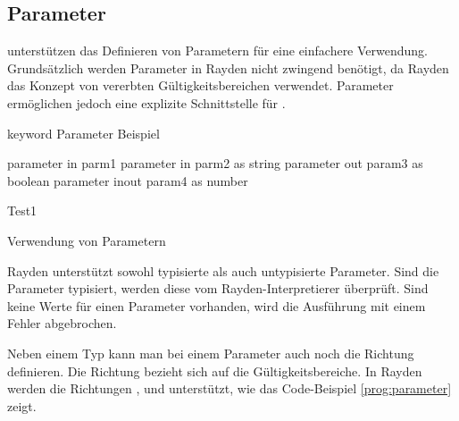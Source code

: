 
\subsection{Parameter}
\label{cha:Parameter}

 unterstützen das Definieren von Parametern für eine einfachere Verwendung. Grundsätzlich werden Parameter in Rayden nicht zwingend benötigt, da Rayden das Konzept von vererbten Gültigkeitsbereichen verwendet. Parameter ermöglichen jedoch eine explizite Schnittstelle für . 

\begin{program}
\begin{JavaCode}
keyword Parameter Beispiel {
	
	parameter in    parm1
	parameter in    parm2 as string
	parameter out   param3 as boolean
	parameter inout param4 as number
	
	Test1	
}
\end{JavaCode}
\caption{Verwendung von Parametern}
\label{prog:parameter}
\end{program}


\SuperPar
Rayden unterstützt sowohl typisierte als auch untypisierte Parameter. Sind die Parameter typisiert, werden diese vom Rayden-Interpretierer überprüft. Sind keine Werte für einen Parameter vorhanden, wird die Ausführung mit einem Fehler abgebrochen. 

\SuperPar
Neben einem Typ kann man bei einem Parameter auch noch die Richtung definieren. Die Richtung bezieht sich auf die Gültigkeitsbereiche. In Rayden werden die Richtungen ,  und  unterstützt, wie das Code-Beispiel \ref{prog:parameter} zeigt. \\

